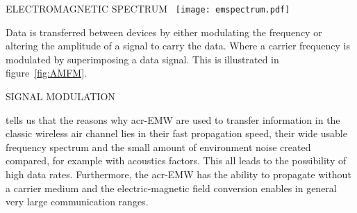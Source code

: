 \begin{RoyalFigure}[!htb, label=fig:emspectrum]{ELECTROMAGNETIC SPECTRUM~\cite{giancoli_physics_2015}}
    \texttt{[image: emspectrum.pdf]}
\end{RoyalFigure}

Data is transferred between devices by either modulating the frequency or altering the amplitude of a signal to carry
the data. Where a carrier frequency is modulated by superimposing a data signal. This is illustrated in 
figure~\ref{fig:AMFM}.

\begin{RoyalFigure}[htb, label=fig:AMFM]{SIGNAL MODULATION}
    \begin{tcbraster}[raster columns=2, raster equal height]
    \end{tcbraster}
\end{RoyalFigure}

\citet{hagman_elias_design_2009} tells us that the reasons why \gls{acr-EMW} are used to transfer information in the 
classic wireless air channel lies in their fast propagation speed, their wide usable frequency spectrum and the small
amount of environment noise created compared, for example with acoustics factors. This all leads to the possibility 
of high data rates. Furthermore, the \gls{acr-EMW} has the ability to propagate without a carrier medium and the 
electric-magnetic field conversion enables in general very large communication ranges.

